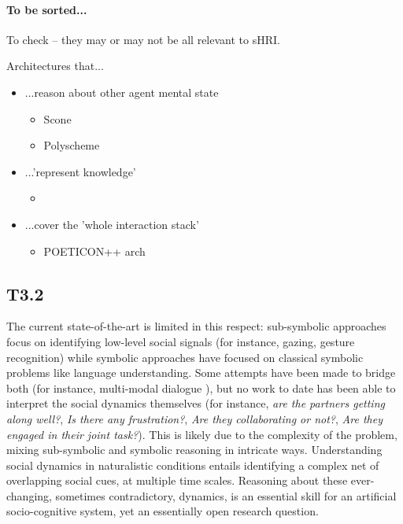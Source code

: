 \documentclass[11pt,a4paper]{report}
\begin{document}
\paragraph{To be sorted...}

To check -- they may or may not be all relevant to sHRI.

Architectures that...

\begin{itemize}
    \item ...reason about other agent mental state
    \begin{itemize}
        \item Scone~\cite{fahlman2011using}
        \item Polyscheme~\cite{bello2011shared}
    \end{itemize}
    \item ...'represent knowledge'
        \begin{itemize}
            \item \cite{zhang2014towards}
        \end{itemize}
    \item ...cover the 'whole interaction stack'
        \begin{itemize}
            \item POETICON++ arch~\cite{antunes2016from} 
        \end{itemize}
\end{itemize}

\subsection{T3.2}

The current state-of-the-art is limited in this respect: sub-symbolic
approaches focus on identifying low-level social signals (for instance,
gazing, gesture recognition) while symbolic approaches have focused on
classical symbolic problems like language understanding. Some attempts
have been made to bridge both (for instance, multi-modal dialogue
\cite{lemaignan2011grounding, lemaignan2017artificial}), but no work to
date has been able to interpret the social dynamics themselves (for
instance, \emph{are the partners getting along well?}, \emph{Is there
any frustration?}, \emph{Are they collaborating or not?}, \emph{Are they
engaged in their joint task?}). This is likely due to the complexity of
the problem, mixing sub-symbolic and symbolic reasoning in intricate
ways. Understanding social dynamics in naturalistic conditions entails
identifying a complex net of overlapping social cues, at multiple time
scales. Reasoning about these ever-changing, sometimes contradictory,
dynamics, is an essential skill for an artificial socio-cognitive
system, yet an essentially open research question.
\end{document}
